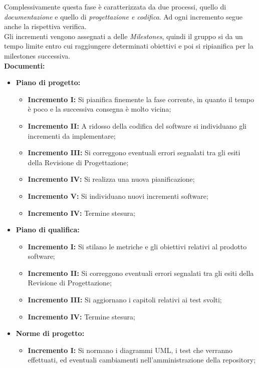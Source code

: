 \documentclass[../piano_di_progetto.tex]{subfiles}
\begin{document}
Complessivamente questa fase è caratterizzata da due processi, quello di \emph{documentazione} e quello di \emph{progettazione e codifica}. Ad ogni incremento segue anche la rispettiva verifica. \\
Gli incrementi vengono assegnati a delle \emph{Milestones}, quindi il gruppo si da un tempo limite entro cui raggiungere determinati obiettivi e poi si ripianifica per la 
milestones successiva.\\
\textbf{Documenti:}
\begin{itemize}
    \item \textbf{Piano di progetto:}
        \begin{itemize}
            \item \textbf{Incremento I:} Si pianifica finemente la fase corrente, in quanto il tempo è poco e la successiva consegna è molto vicina;
            \item \textbf{Incremento II:} A ridosso della codifica del software si individuano gli incrementi da implementare;
            \item \textbf{Incremento III:} Si correggono eventuali errori segnalati tra gli esiti della Revisione di Progettazione;
            \item \textbf{Incremento IV:} Si realizza una nuova pianificazione;
            \item \textbf{Incremento V:} Si individuano nuovi incrementi software;
            \item \textbf{Incremento IV:} Termine stesura;
        \end{itemize}
        \item \textbf{Piano di qualifica:}
        \begin{itemize}
            \item \textbf{Incremento I:} Si stilano le metriche e gli obiettivi relativi al prodotto software;
            \item \textbf{Incremento II:} Si correggono eventuali errori segnalati tra gli esiti della Revisione di Progettazione;
            \item \textbf{Incremento III:} Si aggiornano i capitoli relativi ai test svolti;
            \item \textbf{Incremento IV:} Termine stesura;
        \end{itemize}
        \item \textbf{Norme di progetto:}
        \begin{itemize}
            \item \textbf{Incremento I:} Si normano i diagrammi UML, i test che verranno effettuati, ed eventuali cambiamenti nell'amministrazione della repository;

\end{itemize}
\end{itemize}
\end{document}
